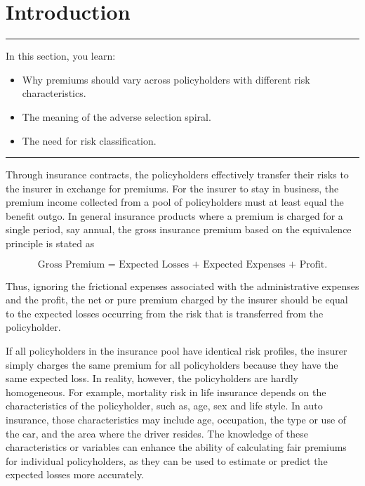 \documentclass[]{book}
\providecommand{\tightlist}{%
  \setlength{\itemsep}{0pt}\setlength{\parskip}{0pt}}
\theoremstyle{definition}
\theoremstyle{definition}
\theoremstyle{definition}
\theoremstyle{remark}
\begin{document}
\section{Introduction}\label{S:RC:Introduction}

\begin{center}\rule{0.5\linewidth}{\linethickness}\end{center}

In this section, you learn:

\begin{itemize}
\tightlist
\item
  Why premiums should vary across policyholders with different risk
  characteristics.\\
\item
  The meaning of the adverse selection spiral.\\
\item
  The need for risk classification.
\end{itemize}

\begin{center}\rule{0.5\linewidth}{\linethickness}\end{center}

Through insurance contracts, the policyholders effectively transfer
their risks to the insurer in exchange for premiums. For the insurer to
stay in business, the premium income collected from a pool of
policyholders must at least equal the benefit outgo. In general
insurance products where a premium is charged for a single period, say
annual, the gross insurance premium based on the equivalence principle
is stated as

\[
\text{Gross Premium = Expected Losses + Expected Expenses + Profit}.
\]

Thus, ignoring the frictional expenses associated with the
administrative expenses and the profit, the net or pure premium charged
by the insurer should be equal to the expected losses occurring from the
risk that is transferred from the policyholder.

If all policyholders in the insurance pool have identical risk profiles,
the insurer simply charges the same premium for all policyholders
because they have the same expected loss. In reality, however, the
policyholders are hardly homogeneous. For example, mortality risk in
life insurance depends on the characteristics of the policyholder, such
as, age, sex and life style. In auto insurance, those characteristics
may include age, occupation, the type or use of the car, and the area
where the driver resides. The knowledge of these characteristics or
variables can enhance the ability of calculating fair premiums for
individual policyholders, as they can be used to estimate or predict the
expected losses more accurately.
\end{document}
